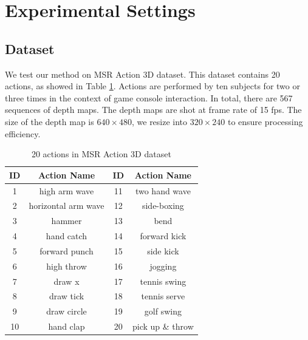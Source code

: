 \documentclass[review]{elsarticle}
\begin{document}

\section{Experimental Settings}
\label{lbl:ExperimentalSettings}

\subsection{Dataset}
We test our method on MSR Action 3D dataset. This dataset contains 20 actions, as showed in Table \ref{lbl:20actions}. Actions are performed by ten subjects for two or three times in the context of game console interaction. In total, there are 567 sequences of depth maps. The depth maps are shot at frame rate of 15 fps. The size of the depth map is $640 \times 480$, we resize into $320 \times 240$ to ensure processing efficiency.

\begin{table}[H]
	\begin{center}
		\begin{tabular}{c|c|c|c}
		
		  {\bf   ID  } & {\bf Action Name} &   {\bf   ID  } & {\bf Action Name} \\
		\hline
		             1 &  high arm wave &             11 &  two hand wave \\
		
		             2 & horizontal arm wave &             12 &    side-boxing \\
		
		             3 &         hammer &             13 &           bend \\
		
		             4 &     hand catch &             14 &   forward kick \\
		
		             5 &  forward punch &             15 &      side kick \\
		
		             6 &     high throw &             16 &        jogging \\
		
		             7 &         draw x &             17 &   tennis swing \\
		
		             8 &      draw tick &             18 &   tennis serve \\
		
		             9 &    draw circle &             19 &     golf swing \\
		
		            10 &      hand clap &             20 & pick up \& throw \\
		
		\end{tabular}
	\end{center}
	\caption{\label{lbl:20actions}20 actions in MSR Action 3D dataset}
\end{table}
\end{document}
